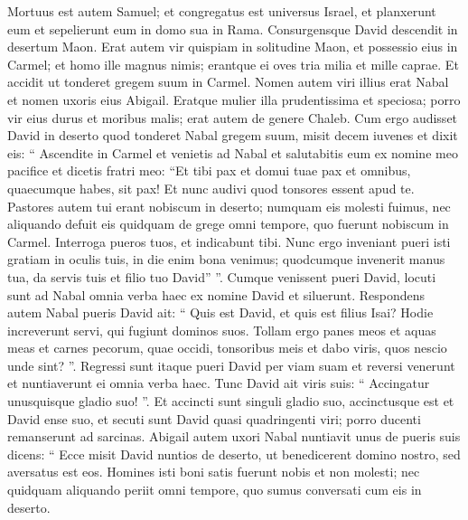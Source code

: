 \begin{biblechapter}
\begin{biblechapter}
\begin{biblechapter}
\begin{biblechapter}
\begin{biblechapter}
\begin{biblechapter}
\begin{biblechapter}
\begin{biblechapter}
\begin{biblechapter}
\begin{biblechapter}
\begin{biblechapter}
\begin{biblechapter}
\begin{biblechapter}
\begin{biblechapter}
\begin{biblechapter}
\begin{biblechapter}
\begin{biblechapter}
\begin{biblechapter}
\begin{biblechapter}
\begin{biblechapter}
\begin{biblechapter}
\begin{biblechapter}
\begin{biblechapter}
\begin{biblechapter}
\begin{biblechapter}
\verse Mortuus est autem Samuel; et congregatus est universus Israel, et planxerunt eum et sepelierunt eum in domo sua in Rama.
 Consurgensque David descendit in desertum Maon. 
\verse Erat autem vir quispiam in solitudine Maon, et possessio eius in Carmel; et homo ille magnus nimis; erantque ei oves tria milia et mille caprae. Et accidit ut tonderet gregem suum in Carmel. 
\verse Nomen autem viri illius erat Nabal et nomen uxoris eius Abigail. Eratque mulier illa prudentissima et speciosa; porro vir eius durus et moribus malis; erat autem de genere Chaleb.
 \verse Cum ergo audisset David in deserto quod tonderet Nabal gregem suum, 
\verse misit decem iuvenes et dixit eis: “ Ascendite in Carmel et venietis ad Nabal et salutabitis eum ex nomine meo pacifice 
\verse et dicetis fratri meo: “Et tibi pax et domui tuae pax et omnibus, quaecumque habes, sit pax! 
\verse Et nunc audivi quod tonsores essent apud te. Pastores autem tui erant nobiscum in deserto; numquam eis molesti fuimus, nec aliquando defuit eis quidquam de grege omni tempore, quo fuerunt nobiscum in Carmel. 
\verse Interroga pueros tuos, et indicabunt tibi. Nunc ergo inveniant pueri isti gratiam in oculis tuis, in die enim bona venimus; quodcumque invenerit manus tua, da servis tuis et filio tuo David” ”.
 \verse Cumque venissent pueri David, locuti sunt ad Nabal omnia verba haec ex nomine David et siluerunt. 
\verse Respondens autem Nabal pueris David ait: “ Quis est David, et quis est filius Isai? Hodie increverunt servi, qui fugiunt dominos suos. 
\verse Tollam ergo panes meos et aquas meas et carnes pecorum, quae occidi, tonsoribus meis et dabo viris, quos nescio unde sint? ”. 
\verse Regressi sunt itaque pueri David per viam suam et reversi venerunt et nuntiaverunt ei omnia verba haec. 
\verse Tunc David ait viris suis: “ Accingatur unusquisque gladio suo! ”. Et accincti sunt singuli gladio suo, accinctusque est et David ense suo, et secuti sunt David quasi quadringenti viri; porro ducenti remanserunt ad sarcinas.
 \verse Abigail autem uxori Nabal nuntiavit unus de pueris suis dicens: “ Ecce misit David nuntios de deserto, ut benedicerent domino nostro, sed aversatus est eos. 
 \verse Homines isti boni satis fuerunt nobis et non molesti; nec quidquam aliquando periit omni tempore, quo sumus conversati cum eis in deserto. 

\end{biblechapter}
\end{biblechapter}
\end{biblechapter}
\end{biblechapter}
\end{biblechapter}
\end{biblechapter}
\end{biblechapter}
\end{biblechapter}
\end{biblechapter}
\end{biblechapter}
\end{biblechapter}
\end{biblechapter}
\end{biblechapter}
\end{biblechapter}
\end{biblechapter}
\end{biblechapter}
\end{biblechapter}
\end{biblechapter}
\end{biblechapter}
\end{biblechapter}
\end{biblechapter}
\end{biblechapter}
\end{biblechapter}
\end{biblechapter}
\end{biblechapter}
